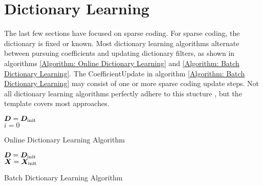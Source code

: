 \section{Dictionary Learning}
The last few sections have focused on sparse coding. For sparse coding, the dictionary is fixed or known. Most dictionary learning algorithms alternate between pursuing coefficients and updating dictionary filters, as shown in algorithms \ref{Algorithm: Online Dictionary Learning} and \ref{Algorithm: Batch Dictionary Learning}. The CoefficientUpdate in algorithm \ref{Algorithm: Batch Dictionary Learning} may consist of one or more sparse coding update steps. Not all dictionary learning algorithms perfectly adhere to this stucture \cite{aharon2006k}, but the template covers most approaches.
\begin{algorithm}[h] 
\SetAlgoLined
   $\bm{D} = \bm{D}_{\text{init}}$ \\
   $i = 0$
 \caption{Online Dictionary Learning Algorithm}\label{Algorithm: Online Dictionary Learning}
\end{algorithm}
\begin{algorithm}[h] 
\SetAlgoLined
   $\bm{D} = \bm{D}_{\text{init}}$ \\
   $\bm{X} = \bm{X}_{\text{init}}$ \\
 \caption{Batch Dictionary Learning Algorithm}\label{Algorithm: Batch Dictionary Learning}
\end{algorithm}

